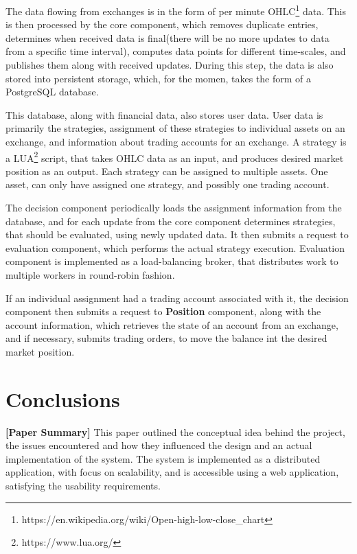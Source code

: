 \documentclass{ExcelAtFIT}
\begin{document}
    The data flowing from exchanges is in the form of per minute OHLC\footnote{https://en.wikipedia.org/wiki/Open-high-low-close\_chart} data.
    This is then processed by the core component, which removes duplicate entries, determines when received data is final(there will be no more
    updates to data from a specific time interval), computes data points for different time-scales, and publishes them along with received updates.
    During this step, the data is also stored into persistent storage, which, for the momen, takes the form of a PostgreSQL database.

    This database, along with financial data, also stores user data. User data is primarily the strategies, assignment of these
    strategies to individual assets on an exchange, and information about trading accounts for an exchange. A strategy is a LUA\footnote{https://www.lua.org/} script, that takes OHLC data as an input, and produces
    desired market position as an output. Each strategy can be assigned to multiple assets.
    One asset, can only have assigned one strategy, and possibly one trading account.

    The decision component periodically loads the assignment information from the database, and for each update from the core
    component determines strategies, that should be evaluated, using newly updated data. It then submits a request to evaluation
    component, which performs the actual strategy execution. Evaluation component is implemented as a load-balancing broker, that distributes work to multiple workers in round-robin fashion.

    If an individual assignment had a trading account associated with it, the decision component then submits a request to \textbf{Position} component, along
    with the account information, which retrieves the state of an account from an exchange, and if necessary, submits trading orders, to
    move the balance int the desired market position.

    \section{Conclusions}
    \label{sec:Conclusions}

    \textbf{[Paper Summary]}
    This paper outlined the conceptual idea behind the project, the issues encountered and how they
    influenced the design and an actual implementation of the system. The system is implemented as a distributed application,
    with focus on scalability, and is accessible using a web application, satisfying the usability requirements.
\end{document}
